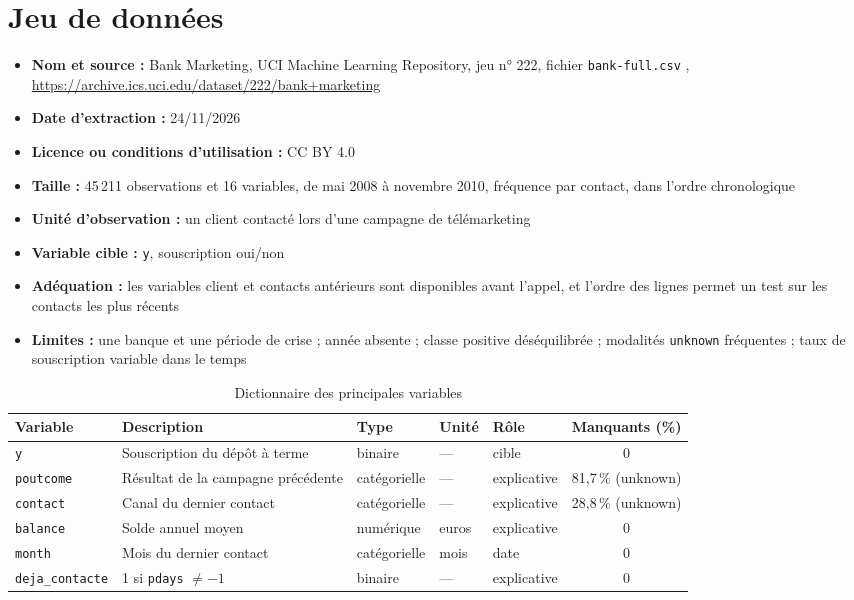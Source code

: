 \documentclass[11pt,a4paper]{article}
\begin{document}
\section{Jeu de données}
\label{sec:donnees}
\begin{itemize}
  \item \textbf{Nom et source :} Bank Marketing, UCI Machine Learning Repository, jeu n° 222, fichier \texttt{bank-full.csv} \cite{donnees}, \url{https://archive.ics.uci.edu/dataset/222/bank+marketing}
  \item \textbf{Date d'extraction :} 24/11/2026
  \item \textbf{Licence ou conditions d'utilisation :} CC BY 4.0
  \item \textbf{Taille :} 45\,211 observations et 16 variables, de mai 2008 à novembre 2010, fréquence par contact, dans l'ordre chronologique
  \item \textbf{Unité d'observation :} un client contacté lors d'une campagne de télémarketing
  \item \textbf{Variable cible :} \texttt{y}, souscription oui/non
  \item \textbf{Adéquation :} les variables client et contacts antérieurs sont disponibles avant l'appel, et l'ordre des lignes permet un test sur les contacts les plus récents
  \item \textbf{Limites :} une banque et une période de crise ; année absente ; classe positive déséquilibrée ; modalités \texttt{unknown} fréquentes ; taux de souscription variable dans le temps
\end{itemize}

\begin{table}[htbp]
  \centering
  \caption{Dictionnaire des principales variables}
  \label{tab:dictionnaire}
  \small
  \begin{tabular}{@{}l P{5.6cm} l l l c@{}}
    \toprule
    Variable & Description & Type & Unité & Rôle & Manquants (\%) \\
    \midrule
    \texttt{y} & Souscription du dépôt à terme & binaire & — & cible & 0 \\
    \texttt{poutcome} & Résultat de la campagne précédente & catégorielle & — & explicative & 81,7\,\% (unknown) \\
    \texttt{contact} & Canal du dernier contact & catégorielle & — & explicative & 28,8\,\% (unknown) \\
    \texttt{balance} & Solde annuel moyen & numérique & euros & explicative & 0 \\
    \texttt{month} & Mois du dernier contact & catégorielle & mois & date & 0 \\
    \texttt{deja\_contacte} & 1 si \texttt{pdays} $\ne -1$ & binaire & — & explicative & 0 \\
    \bottomrule
  \end{tabular}
\end{table}
\end{document}
